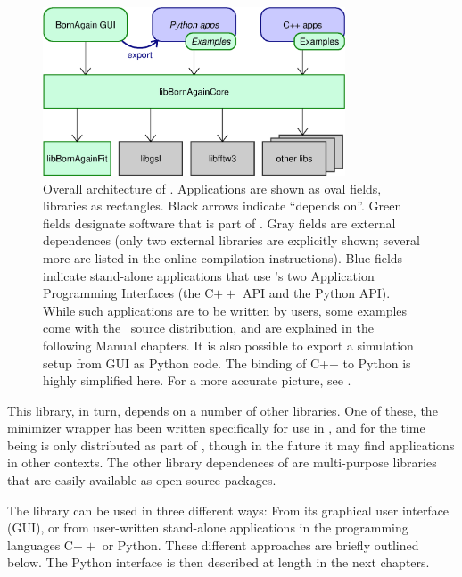 \begin{figure}[tbh]
\begin{center}
\includegraphics[width=0.8\textwidth]{fig/drawing/architecture1.ps}
\end{center}
\caption{Overall architecture of \BornAgain.
%
Applications are shown as oval fields, libraries as rectangles.
Black arrows indicate ``depends on''.
Green fields designate software that is part of \BornAgain.
Gray fields are external dependences
(only two external libraries are explicitly shown;
several more are listed in the online compilation instructions).
Blue fields indicate stand-alone applications that use \BornAgain's
two Application Programming Interfaces (the C$++$ API and the Python API).
While such applications are to be written by users,
some examples come with the \BornAgain\ source distribution,
and are explained in the following Manual chapters.
It is also possible to export a simulation setup from GUI as Python code.
The binding of C++ to Python is highly simplified here.
For a more accurate picture, see .}
\label{Farch1}
\end{figure}

This library, in turn, depends on a number of other libraries.
One of these, the minimizer wrapper 
has been written specifically for use in \BornAgain,
and for the time being is only distributed as part of \BornAgain,
though in the future it may find applications in other contexts.
The other library dependences of 
are multi-purpose libraries that are easily available as open-source packages.

The library  can be used in three different ways:
From its graphical user interface (GUI), or
from user-written stand-alone applications in the programming languages C$++$ or Python.
These different approaches are briefly outlined below.
The Python interface is then described at length in the next chapters.

